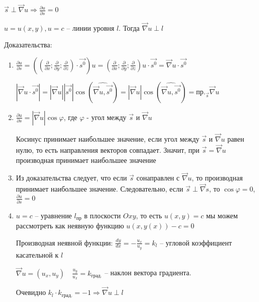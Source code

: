 \documentclass[12pt]{article}
\begin{document}
    \begin{MyTheorem}
         $\vec{s} \perp \vec\nabla u \Longrightarrow \frac{\partial u}{\partial s} = 0$
    \end{MyTheorem}

    \begin{MyTheorem}
         $u = u(x, y), u = c$ -- линии уровня $l$. Тогда $\vec\nabla u \perp l$
    \end{MyTheorem}

    Доказательства:

    \begin{enumerate}
        \item \begin{MyProof}
            $\frac{\partial u}{\partial s} = \left(\left(\frac{\partial}{\partial x}; \frac{\partial}{\partial y}; \frac{\partial}{\partial z}\right) \cdot \vec{s^0}\right) u = \left(\frac{\partial}{\partial x}; \frac{\partial}{\partial y}; \frac{\partial}{\partial z}\right) u \cdot \vec{s^0} =
            \vec\nabla u \cdot \vec{s^0}$
            
            $|\vec\nabla u \cdot \vec{s^0}| = |\vec\nabla u| |\vec{s^0}| \cos(\widehat{\vec\nabla u, \vec{s^0}}) =
            |\vec\nabla u| \cos(\widehat{\vec\nabla u, \vec{s^0}}) = \text{пр.}_{\vec{s}} \vec\nabla u$
        \end{MyProof}

        \item \begin{MyProof}
            $\frac{\partial u}{\partial s} = |\vec\nabla u| \cos\varphi$, где $\varphi$ - угол между $\vec{s}$ и $\vec\nabla u$

            Косинус принимает наибольшее значение, если угол между $\vec{s}$ и $\vec\nabla u$ равен нулю, то есть направления векторов совпадает. Значит, при $\vec{s} = \vec\nabla u$ производная принимает наибольшее значение
        \end{MyProof}

        \item \begin{MyProof}
            Из доказательства  следует, что если $\vec{s}$ сонаправлен с $\vec\nabla u$, то производная принимает наибольшее значение. Следовательно, если $\vec{s} \perp \vec\nabla s$, то $\cos\varphi = 0$, $\frac{\partial u}{\partial s} = 0$
        \end{MyProof}

        \item \begin{MyProof}
            $u = c$ -- уравнение $l_{\text{пр}}$ в плоскости $Oxy$, то есть $u(x, y) = c$ мы можем рассмотреть как неявную функцию $u(x, y(x)) - c = 0$

            Производная неявной функции: $\frac{dy}{dx} = -\frac{u_x}{u_y} = k_l$ -- угловой коэффициент касательной к $l$

            $\vec\nabla u = (u_x, u_y) \quad \frac{u_y}{u_x} = k_{\text{град.}}$ -- наклон вектора градиента.

            Очевидно $k_l \cdot k_{\text{град.}} = -1 \Longrightarrow \vec\nabla u \perp l$
        \end{MyProof}
    \end{enumerate}
\end{document}
